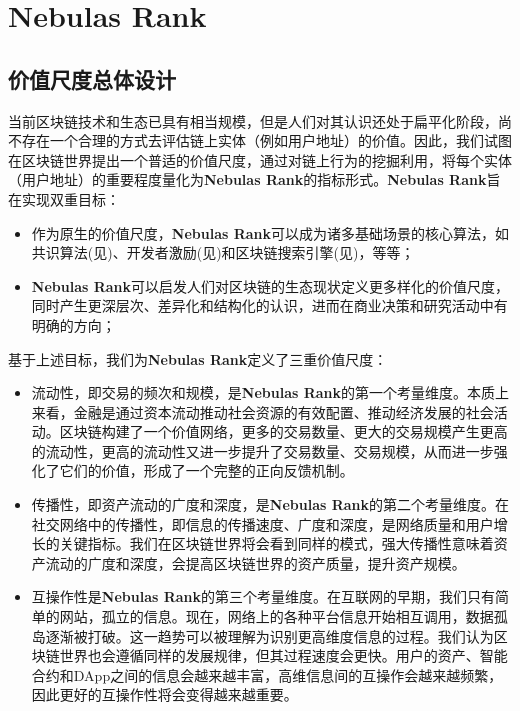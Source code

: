 \section{Nebulas Rank}
\label{sec:rank}

\subsection{价值尺度总体设计} \label{subsec:value}
当前区块链技术和生态已具有相当规模，但是人们对其认识还处于扁平化阶段，尚不存在一个合理的方式去评估链上实体（例如用户地址）的价值。因此，我们试图在区块链世界提出⼀个普适的价值尺度，通过对链上行为的挖掘利用，将每个实体（用户地址）的重要程度量化为\textbf{Nebulas Rank}的指标形式。\textbf{Nebulas Rank}旨在实现双重目标：
\begin{itemize}
	\item 作为原生的价值尺度，\textbf{Nebulas Rank}可以成为诸多基础场景的核心算法，如共识算法(见)、开发者激励(见)和区块链搜索引擎(见)，等等；
	\item \textbf{Nebulas Rank}可以启发人们对区块链的生态现状定义更多样化的价值尺度，同时产生更深层次、差异化和结构化的认识，进而在商业决策和研究活动中有明确的方向；
\end{itemize}
基于上述目标，我们为\textbf{Nebulas Rank}定义了三重价值尺度：
\begin{itemize}
	\item 流动性，即交易的频次和规模，是\textbf{Nebulas Rank}的第⼀个考量维度。本质上来看，⾦融是通过资本流动推动社会资源的有效配置、推动经济发展的社会活动。区块链构建了⼀个价值⽹络，更多的交易数量、更⼤的交易规模产⽣更⾼的流动性，更⾼的流动性⼜进⼀步提升了交易数量、交易规模，从⽽进⼀步强化了它们的价值，形成了⼀个完整的正向反馈机制。
	\item 传播性，即资产流动的⼴度和深度，是\textbf{Nebulas Rank}的第⼆个考量维度。在社交网络中的传播性，即信息的传播速度、⼴度和深度，是⽹络质量和⽤户增长的关键指标。我们在区块链世界将会看到同样的模式，强⼤传播性意味着资产流动的⼴度和深度，会提⾼区块链世界的资产质量，提升资产规模。
	\item 互操作性是\textbf{Nebulas Rank}的第三个考量维度。在互联⽹的早期，我们只有简单的⽹站，孤⽴的信息。现在，⽹络上的各种平台信息开始相互调⽤，数据孤岛逐渐被打破。这⼀趋势可以被理解为识别更⾼维度信息的过程。我们认为区块链世界也会遵循同样的发展规律，但其过程速度会更快。⽤户的资产、智能合约和DApp之间的信息会越来越丰富，⾼维信息间的互操作会越来越频繁，因此更好的互操作性将会变得越来越重要。
\end{itemize}

